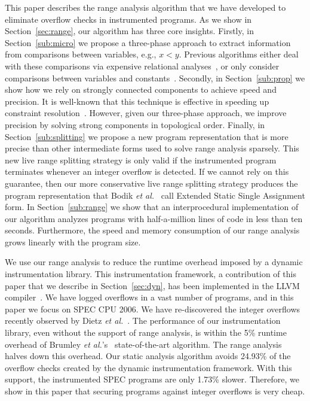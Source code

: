 \documentclass{sigplanconf}[10pt]
\begin{document}
This paper describes the range analysis algorithm that
we have developed to eliminate overflow checks in instrumented programs.
As we show in Section~\ref{sec:range}, our algorithm has three core insights.
Firstly, in Section~\ref{sub:micro} we propose a three-phase approach to extract
information from comparisons between variables, e.g., $x < y$.
Previous algorithms either deal with these comparisons via
expensive relational analyses~\cite{Cousot78,Lakhdar11,Mine06}, or only
consider comparisons between variables and
constants~\cite{Mahlke01,Patterson95,Stephenson00}.
Secondly, in Section~\ref{sub:prop} we show how we rely on strongly connected
components to achieve speed and precision.
It is well-known that this technique is effective in speeding up constraint
resolution~\cite[Sec 6.3]{Nielson99}.
However, given our three-phase approach, we improve precision
by solving strong components in topological order.
Finally, in Section~\ref{sub:splitting} we propose a new program representation that
is more precise than other intermediate forms used to solve range
analysis sparsely.
This new live range splitting strategy is only valid if the instrumented
program terminates whenever an integer overflow is detected.
If we cannot rely on this guarantee, then our more conservative live range splitting
strategy produces the program representation that Bodik
{\em et al.}~\cite{Bodik00} call Extended Static Single Assignment
form.
In Section~\ref{sub:range} we show that an interprocedural implementation of our
algorithm analyzes programs with half-a-million lines of code in less than ten
seconds.
Furthermore, the speed and memory consumption of our range analysis grows linearly
with the program size.

We use our range analysis to reduce the runtime overhead imposed by a dynamic
instrumentation library.
This instrumentation framework, a contribution of this paper that we describe in
Section~\ref{sec:dyn}, has been implemented in the LLVM compiler~\cite{Lattner04}.
We have logged overflows in a vast number of programs, and in this
paper we focus on SPEC CPU 2006.
We have re-discovered the integer overflows recently observed by
Dietz {\em et al.}~\cite{Dietz12}.
The performance of our instrumentation library, even without the support of range
analysis, is within the 5\% runtime overhead of Brumley {\em et al.}'s~\cite{Brumley07}
state-of-the-art algorithm.
The range analysis halves down this overhead.
Our static analysis algorithm avoids 24.93\% of the overflow
checks created by the dynamic instrumentation framework.
With this support, the instrumented SPEC programs are only 1.73\% slower.
Therefore, we show in this paper that securing programs against integer overflows
is very cheap.
\end{document}
